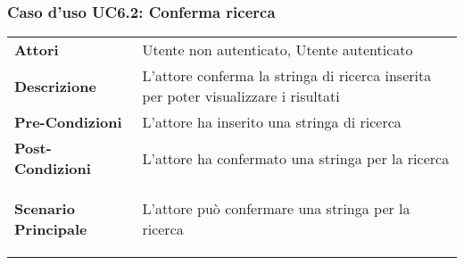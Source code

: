 \subsubsection{Caso d'uso UC6.2: Conferma ricerca}
\label{UC6_2}

\begin{minipage}{\linewidth}
	\begin{tabular}{ l | p{11cm}}
		\hline
		\rowcolor{Gray}
		\multicolumn{2}{c}{UC6.2 - Conferma ricerca} \\
		\hline
		\textbf{Attori} & Utente non autenticato, Utente autenticato \\
		\textbf{Descrizione} & L'attore conferma la stringa di ricerca inserita per poter visualizzare i risultati\\
		\textbf{Pre-Condizioni} & L'attore ha inserito una stringa di ricerca\\
		\textbf{Post-Condizioni} & L'attore ha confermato una stringa per la ricerca \\
		\textbf{Scenario Principale} & 
		\begin{enumerate*}[label=(\arabic*.),itemjoin={\newline}]
			\item L'attore può confermare una stringa per la ricerca
		\end{enumerate*}\\
	\end{tabular}
\end{minipage}